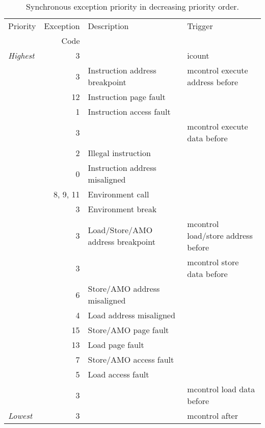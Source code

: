 \begin{table}[H]
\centering
\label{tab:priority}
\begin{tabular}{|l|r|l|l|}
  \hline
  Priority      & Exception & Description & Trigger \\
                &      Code &             & \\
  \hline
  {\em Highest} &          3 & & icount \\ \hline
                &          3 & Instruction address breakpoint & mcontrol execute address before \\ \hline
                &         12 & Instruction page fault & \\ \hline
                &          1 & Instruction access fault & \\ \hline
                &          3 & & mcontrol execute data before \\ \hline
                &          2 & Illegal instruction & \\
                &          0 & Instruction address misaligned & \\
                &   8, 9, 11 & Environment call & \\
                &          3 & Environment break & \\
                &          3 & Load/Store/AMO address breakpoint & mcontrol load/store address before \\
                &          3 & & mcontrol store data before \\ \hline
                &          6 & Store/AMO address misaligned & \\
                &          4 & Load address misaligned & \\ \hline
                &         15 & Store/AMO page fault & \\
                &         13 & Load page fault & \\ \hline
                &          7 & Store/AMO access fault & \\
                &          5 & Load access fault & \\ \hline
                &          3 & & mcontrol load data before \\
  {\em Lowest}  &          3 & & mcontrol after \\
  \hline
\end{tabular}
\caption{Synchronous exception priority in decreasing priority order.}
\end{table}

